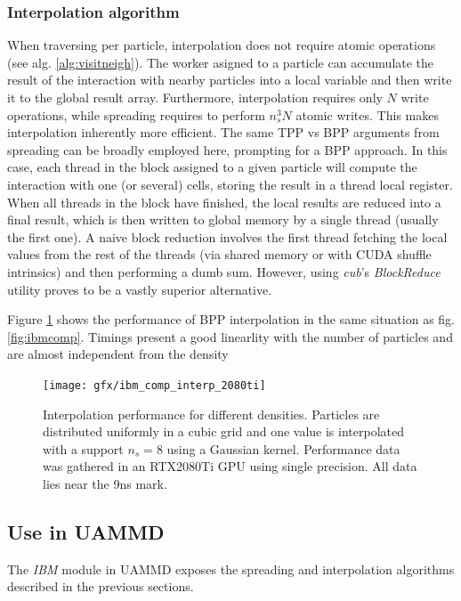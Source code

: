 \documentclass[ twoside,openright,titlepage,numbers=noenddot,%
headinclude,footinclude,cleardoublepage=empty,abstract=on,
BCOR=5mm,paper=a4,fontsize=11pt, dvipsnames
]{scrreprt}
\newcommand{\uammd}{\gls{UAMMD}\xspace}
\newcommand{\gpu}{\gls{GPU}\xspace}
\begin{document}
\subsubsection*{Interpolation algorithm}
When traversing per particle, interpolation does not require atomic operations (see alg. \ref{alg:visitneigh}). The worker asigned to a particle can accumulate the result of the interaction with nearby particles into a local variable and then write it to the global result array. Furthermore, interpolation requires only $N$ write operations, while spreading requires to perform $n_s^3N$ atomic writes. This makes interpolation inherently more efficient.
The same TPP vs BPP arguments from spreading can be broadly employed here, prompting for a BPP approach. In this case, each thread in the block assigned to a given particle will compute the interaction with one (or several) cells, storing the result in a thread local register.
When all threads in the block have finished, the local results are reduced into a final result, which is then written to global memory by a single thread (usually the first one).
A naive block reduction involves the first thread fetching the local values from the rest of the threads (via shared memory or with CUDA shuffle intrinsics) and then performing a dumb sum. However, using \emph{cub}'s\cite{cub} \emph{BlockReduce} utility proves to be a vastly superior alternative.

Figure \ref{fig:ibmcompinterp} shows the performance of BPP interpolation in the same situation as fig. \ref{fig:ibmcomp}. Timings present a good linearlity with the number of particles and are almost independent from the density 
\begin{figure}[h]
  \centering
\texttt{[image: gfx/ibm\_comp\_interp\_2080ti]}
\caption{Interpolation performance for different densities. Particles are distributed uniformly in a cubic grid and one value is interpolated with a support $n_s=8$ using a Gaussian kernel. Performance data was gathered in an RTX2080Ti \gpu using single precision. All data lies near the 9ns mark.}
  \label{fig:ibmcompinterp}
\end{figure}

\subsection*{Use in UAMMD}

The \emph{IBM} module in \uammd exposes the spreading and interpolation algorithms described in the previous sections.
\end{document}
